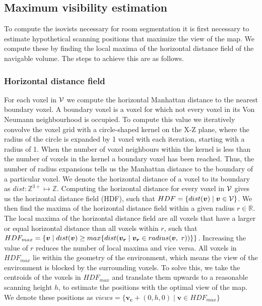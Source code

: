 \documentclass{article}
\begin{document}
\subsection{Maximum visibility estimation}
To compute the isovists necessary for room segmentation it is first necessary to estimate hypothetical scanning positions that maximize the view of the map. We compute these by finding the local maxima of the horizontal distance field of the navigable volume. The steps to achieve this are as follows. 

\subsubsection{Horizontal distance field}
For each voxel in \(\mathcal{V}\) we compute the horizontal Manhattan distance to the nearest boundary voxel. A boundary voxel is a voxel for which not every voxel in its Von Neumann neighbourhood is occupied. To compute this value we iteratively convolve the voxel grid with a circle-shaped kernel on the X-Z plane, where the radius of the circle is expanded by 1 voxel with each iteration, starting with a radius of 1. When the number of voxel neighbours within the kernel is less than the number of voxels in the kernel a boundary voxel has been reached. Thus, the number of radius expansions tells us the Manhattan distance to the boundary of a particular voxel. We denote the horizontal distance of a voxel to its boundary as \(dist: \mathbb{Z}^{3+} \mapsto \mathbb{Z}\). Computing the horizontal distance for every voxel in \(\mathcal{V}\) gives us the horizontal distance field (HDF), such that \(HDF = \{dist(\boldsymbol{v}) \mid \boldsymbol{v} \in \mathcal{V}\}\). We then find the maxima of the horizontal distance field within a given radius \(r \in \mathbb{R}\).  The local maxima of the horizontal distance field are all voxels that have a larger or equal horizontal distance than all voxels within \(r\), such that \(HDF_{max} = \{\boldsymbol{v} \mid dist(\boldsymbol{v}) \geq max \{dist(\boldsymbol{v_{r}} \mid \boldsymbol{v_{r}} \in radius(\boldsymbol{v},\ r))\}\}\). Increasing the value of \(r\) reduces the number of local maxima and vice versa. All voxels in \(HDF_{max}\) lie within the geometry of the environment, which means the view of the environment is blocked by the surrounding voxels. To solve this, we take the centroids of the voxels in \(HDF_{max}\) and translate them upwards to a reasonable scanning height \(h\), to estimate the positions with the optimal view of the map. We denote these positions as \(views = \{\boldsymbol{v_c} + (0, h, 0) \mid \boldsymbol{v} \in HDF_{max}\}\)
\end{document}
